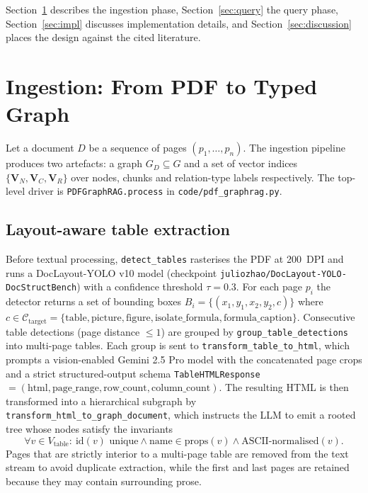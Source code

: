 \documentclass[11pt,a4paper]{article}
\begin{document}
Section~\ref{sec:ingestion} describes the ingestion phase, Section~\ref{sec:query}
the query phase, Section~\ref{sec:impl} discusses implementation details, and
Section~\ref{sec:discussion} places the design against the cited literature.

\section{Ingestion: From PDF to Typed Graph}
\label{sec:ingestion}

Let a document $D$ be a sequence of pages $(p_1,\dots,p_n)$. The ingestion
pipeline produces two artefacts: a graph $G_D\subseteq G$ and a set of vector
indices $\{\mathbf{V}_N,\mathbf{V}_C,\mathbf{V}_R\}$ over nodes, chunks and
relation-type labels respectively. The top-level driver is
\texttt{PDFGraphRAG.process} in \texttt{code/pdf\_graphrag.py}.

\subsection{Layout-aware table extraction}

Before textual processing, \texttt{detect\_tables} rasterises the PDF at
200~DPI and runs a DocLayout-YOLO v10 model (checkpoint
\texttt{juliozhao/DocLayout-YOLO-DocStructBench}) with a confidence threshold
$\tau=0.3$. For each page $p_i$ the detector returns a set of bounding boxes
$B_i=\{(x_1,y_1,x_2,y_2,c)\}$ where $c\in\mathcal{C}_{\text{target}}=\{\text{table},
\text{picture}, \text{figure}, \text{isolate\_formula}, \text{formula\_caption}\}$.
Consecutive table detections (page distance $\leq 1$) are grouped by
\texttt{group\_table\_detections} into multi-page tables. Each group is sent
to \texttt{transform\_table\_to\_html}, which prompts a vision-enabled
Gemini 2.5 Pro model with the concatenated page crops and a strict
structured-output schema
\texttt{TableHTMLResponse} $=(\text{html}, \text{page\_range}, \text{row\_count},
\text{column\_count})$. The resulting HTML is then transformed into a
hierarchical subgraph by \texttt{transform\_html\_to\_graph\_document}, which
instructs the LLM to emit a rooted tree whose nodes satisfy the invariants
\[
\forall v\in V_{\text{table}}:\ \text{id}(v)\text{ unique}\wedge
\text{name}\in\text{props}(v)\wedge \text{ASCII-normalised}(v).
\]
Pages that are strictly interior to a multi-page table are removed from the
text stream to avoid duplicate extraction, while the first and last pages are
retained because they may contain surrounding prose.
\end{document}
